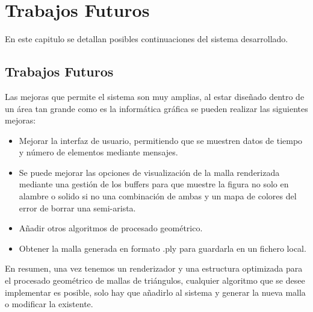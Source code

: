 \chapter{ Trabajos Futuros}

En este capitulo se detallan posibles continuaciones del sistema desarrollado.

\section{ Trabajos Futuros}

Las mejoras que permite el sistema son muy amplias, al estar diseñado dentro de un área tan grande como es la informática gráfica se pueden realizar las siguientes mejoras: 

\begin{itemize}
	\item Mejorar la interfaz de usuario, permitiendo que se muestren datos de tiempo y número de elementos mediante mensajes.
	\item Se puede mejorar las opciones de visualización de la malla renderizada mediante una gestión de los buffers para que muestre la figura no solo en alambre o solido si no una combinación de ambas y un mapa de colores del error de borrar una semi-arista.
	\item Añadir otros algoritmos de procesado geométrico.
	\item Obtener la malla generada en formato .ply para guardarla en un fichero local.
\end{itemize}

En resumen, una vez tenemos un renderizador y una estructura optimizada para el procesado geométrico de mallas de triángulos, cualquier algoritmo que se desee implementar es posible, solo hay que añadirlo al sistema y generar la nueva malla o modificar la existente. 